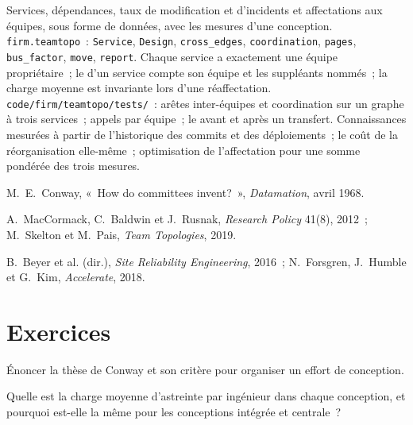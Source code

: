 \begin{build}
 Services, dépendances, taux de modification et d'incidents et affectations aux équipes, sous forme de données, avec les mesures d'une conception.
 \texttt{firm.teamtopo}~: \texttt{Service}, \texttt{Design}, \texttt{cross\_edges}, \texttt{coordination}, \texttt{pages},
\texttt{bus\_factor}, \texttt{move}, \texttt{report}.
 Chaque service a exactement une équipe propriétaire~; le  d'un service compte son équipe et les suppléants nommés~; la charge moyenne est invariante
lors d'une réaffectation.
 \texttt{code/firm/teamtopo/tests/}~: arêtes inter-équipes et coordination sur un graphe à trois services~; appels par équipe~; le 
avant et après un transfert.
 Connaissances mesurées à partir de l'historique des commits et des déploiements~; le coût de la réorganisation elle-même~; optimisation de l'affectation pour une
somme pondérée des trois mesures.
\end{build}

\begin{omsources}
\item M.~E.~Conway, «~How do committees invent?~», \emph{Datamation}, avril 1968.
\item A.~MacCormack, C.~Baldwin et J.~Rusnak, \emph{Research Policy} 41(8), 2012~; M.~Skelton et M.~Pais, \emph{Team Topologies}, 2019.
\item B.~Beyer et al. (dir.), \emph{Site Reliability Engineering}, 2016~; N.~Forsgren, J.~Humble et G.~Kim, \emph{Accelerate}, 2018.
\end{omsources}

\section{Exercices}

\begin{exercise}[$\star$]\label{exo:fm:engineering-organisation-design:1}
Énoncer la thèse de Conway et son critère pour organiser un effort de conception.
\end{exercise}

\begin{exercise}[$\star$]\label{exo:fm:engineering-organisation-design:2}
Quelle est la charge moyenne d'astreinte par ingénieur dans chaque conception, et pourquoi est-elle la même pour les conceptions intégrée et centrale~?
\end{exercise}

